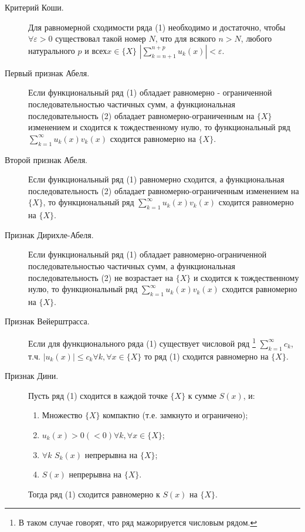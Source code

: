 \documentclass[a4paper,12pt]{scrartcl}
\begin{document}
\begin{description}
\item[Критерий Коши.] Для равномерной сходимости ряда (1) необходимо и достаточно, чтобы $\forall \varepsilon >0 $ существовал такой номер $N$, что для всякого $n > N$,  любого натурального $p$ и всех$x\in\{X\}$  $|\sum\limits_{k = n+1}^{n+p}u_k(x)| < \varepsilon$.
\item[Первый признак Абеля.] Если функциональный ряд (1) обладает равномерно - ограниченной последовательностью частичных сумм, а функциональная последовательность (2) обладает равномерно-ограниченным на $\{X\}$ изменением и сходится к тождественному нулю, то функциональный ряд $\sum\limits_{k=1}^{\infty}u_k(x)v_k(x)$ сходится равномерно на $\{X\}$.
\item[Второй признак Абеля.] Если функциональный ряд (1) равномерно сходится, а функциональная последовательность (2) обладает равномерно-ограниченным изменением  на $\{X\}$, то функциональный ряд $\sum\limits_{k=1}^{\infty}u_k(x)v_k(x)$ сходится равномерно на $\{X\}$.
\item[Признак Дирихле-Абеля.] Если функциональный ряд (1) обладает равномерно-ограниченной последовательностью частичных сумм, а функциональная последовательность (2) не возрастает на $\{X\}$ и сходится к тождественному нулю, то функциональный ряд $\sum\limits_{k=1}^{\infty}u_k(x)v_k(x)$ сходится равномерно на $\{X\}$.
\item[Признак Вейерштрасса.] Если для функционального ряда (1) существует числовой ряд \footnote{В таком случае говорят, что ряд мажорируется числовым рядом.} $\sum\limits_{k=1}^{\infty}c_k$, т.ч. $|u_k(x)| \leqslant c_k \forall k, \forall x\in \{X\}$  то ряд (1) сходится равномерно на $\{X\}$.
\item[Признак Дини.] Пусть ряд (1) сходится в каждой точке $\{X\}$ к сумме $S(x)$, и:
\begin{enumerate}
\item Множество $\{X\}$ компактно (т.е. замкнуто и ограничено);
\item $u_k(x) > 0 (<0) \forall k,\forall x\in\{X\}$;
\item $\forall k$  $S_k(x)$ непрерывна на $\{X\}$;
\item $S(x)$ непрерывна на $\{X\}$.
\end{enumerate}
Тогда ряд (1) сходится равномерно к $S(x)$ на $\{X\}$.
\end{description}
\end{document}

